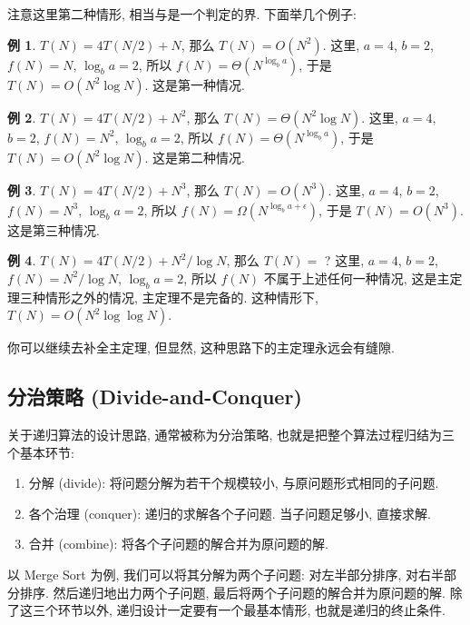 \documentclass[a4paper]{ctexart}
\theoremstyle{definition}
\theoremstyle{definition}
\newtheorem{example}{例}[section]
\begin{document}
注意这里第二种情形, 相当与是一个判定的界. 下面举几个例子:

\begin{example}
$T(N) = 4 T(N / 2) + N$, 那么 $T(N) = O(N^2)$.
这里, $a = 4$, $b = 2$, $f(N) = N$, $\log_b a = 2$, 所以 $f(N) = \Theta(N^{\log_b a})$, 于是 $T(N) = O(N^2 \log N)$. 这是第一种情况. 
\end{example}

\begin{example}
$T(N) = 4 T(N / 2) + N^2$, 那么 $T(N) = \Theta(N^2\log N)$.
  这里, $a = 4$, $b = 2$, $f(N) = N^2$, $\log_b a = 2$, 所以 $f(N) = \Theta(N^{\log_b a})$, 于是 $T(N) = O(N^2 \log N)$. 这是第二种情况.
\end{example}

\begin{example}
$T(N) = 4 T(N / 2) + N^3$, 那么 $T(N) = O(N^3)$.
  这里, $a = 4$, $b = 2$, $f(N) = N^3$, $\log_b a = 2$, 所以 $f(N) = \Omega(N^{\log_b a + \epsilon})$, 于是 $T(N) = O(N^3)$. 这是第三种情况.
\end{example}

\begin{example}
$T(N) = 4 T(N / 2) + N^2 / \log N$, 那么 $T(N) = $ ?  
  这里, $a = 4$, $b = 2$, $f(N) = N^2 / \log N$, $\log_b a = 2$, 所以 $f(N)$ 不属于上述任何一种情况, 这是主定理三种情形之外的情况, 主定理不是完备的. 这种情形下, 
  $T(N) = O(N^2 \log \log N)$. 
\end{example}

你可以继续去补全主定理, 但显然, 这种思路下的主定理永远会有缝隙. 

\subsection{分治策略 (Divide-and-Conquer)}

关于递归算法的设计思路, 通常被称为分治策略, 也就是把整个算法过程归结为三个基本环节: 
\begin{enumerate}
  \item 分解 (divide): 将问题分解为若干个规模较小, 与原问题形式相同的子问题.
  \item 各个治理 (conquer): 递归的求解各个子问题. 当子问题足够小, 直接求解.
  \item 合并 (combine): 将各个子问题的解合并为原问题的解.
\end{enumerate}
以 Merge Sort 为例, 我们可以将其分解为两个子问题: 对左半部分排序, 对右半部分排序. 然后递归地出力两个子问题, 
最后将两个子问题的解合并为原问题的解. 除了这三个环节以外, 递归设计一定要有一个最基本情形, 也就是递归的终止条件. 
\end{document}
